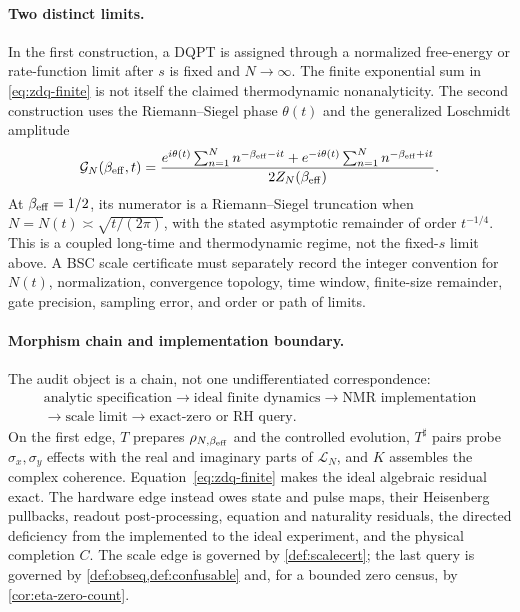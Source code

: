 \documentclass[11pt,a4paper]{article}
\theoremstyle{definition}
\theoremstyle{plain}
\theoremstyle{remark}
\begin{document}
\paragraph{Two distinct limits.}
In the first construction, a DQPT is assigned through a normalized
free-energy or rate-function limit after \(s\) is fixed and
\(N\to\infty\).  The finite exponential sum in
\eqref{eq:zdq-finite} is not itself the claimed thermodynamic
nonanalyticity.  The second construction uses the Riemann--Siegel phase
\(\theta(t)\) and the generalized Loschmidt amplitude
\[
 \mathcal G_N(\beta_{\rm eff},t)
 =\frac{
 e^{i\theta(t)}\sum_{n=1}^{N}n^{-\beta_{\rm eff}-it}
 +e^{-i\theta(t)}\sum_{n=1}^{N}n^{-\beta_{\rm eff}+it}}
 {2Z_N(\beta_{\rm eff})}.
\]
At \(\beta_{\rm eff}=1/2\), its numerator is a Riemann--Siegel truncation
when \(N=N(t)\asymp\sqrt{t/(2\pi)}\), with the stated asymptotic remainder
of order \(t^{-1/4}\).  This is a coupled long-time and thermodynamic regime,
not the fixed-\(s\) limit above.  A BSC scale certificate must separately
record the integer convention for \(N(t)\), normalization, convergence
topology, time window, finite-size remainder, gate precision, sampling error,
and order or path of limits.

\paragraph{Morphism chain and implementation boundary.}
The audit object is a chain, not one undifferentiated correspondence:
\[
 \begin{gathered}
 \text{analytic specification}\longrightarrow
 \text{ideal finite dynamics}\longrightarrow
 \text{NMR implementation}\\
 {}\longrightarrow\text{scale limit}\longrightarrow
 \text{exact-zero or RH query}.
 \end{gathered}
\]
On the first edge, \(T\) prepares \(\rho_{N,\beta_{\rm eff}}\) and the
controlled evolution, \(T^\sharp\) pairs probe \(\sigma_x,\sigma_y\)
effects with the real and imaginary parts of \(\mathcal L_N\), and \(K\)
assembles the complex coherence.  Equation~\eqref{eq:zdq-finite} makes the
ideal algebraic residual exact.  The hardware edge instead owes state and
pulse maps, their Heisenberg pullbacks, readout post-processing, equation and
naturality residuals, the directed deficiency from the implemented to the
ideal experiment, and the physical completion \(C\).  The scale edge is
governed by \cref{def:scalecert}; the last query is governed by
\cref{def:obseq,def:confusable} and, for a bounded zero census, by
\cref{cor:eta-zero-count}.
\end{document}
